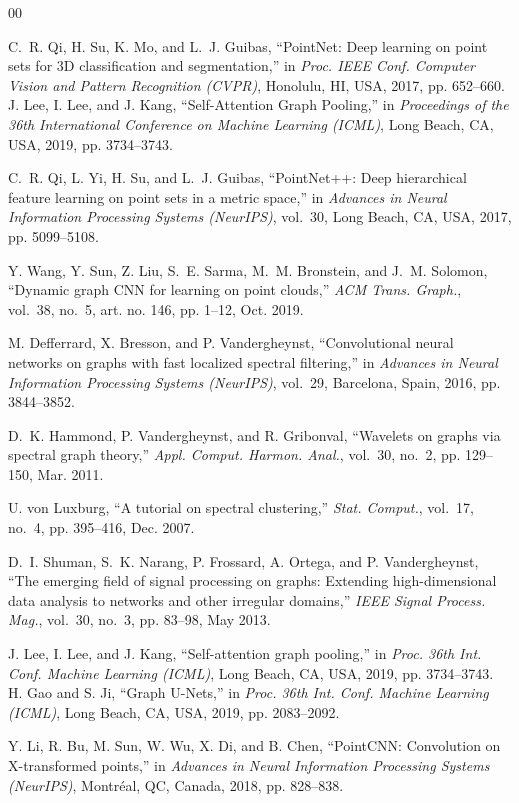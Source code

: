 \documentclass[conference]{IEEEtran}
\begin{document}
\begin{thebibliography}{00}

 C.~R. Qi, H. Su, K. Mo, and L.~J. Guibas, ``PointNet: Deep learning on point sets for 3D classification and segmentation,'' in \emph{Proc. IEEE Conf. Computer Vision and Pattern Recognition (CVPR)}, Honolulu, HI, USA, 2017, pp. 652--660.
 J. Lee, I. Lee, and J. Kang, ``Self-Attention Graph Pooling,'' 
in \emph{Proceedings of the 36th International Conference on Machine Learning (ICML)}, 
Long Beach, CA, USA, 2019, pp. 3734--3743.

 C.~R. Qi, L. Yi, H. Su, and L.~J. Guibas, ``PointNet++: Deep hierarchical feature learning on point sets in a metric space,'' in \emph{Advances in Neural Information Processing Systems (NeurIPS)}, vol.~30, Long Beach, CA, USA, 2017, pp. 5099--5108.

 Y. Wang, Y. Sun, Z. Liu, S.~E. Sarma, M.~M. Bronstein, and J.~M. Solomon, ``Dynamic graph CNN for learning on point clouds,'' \emph{ACM Trans. Graph.}, vol.~38, no.~5, art. no. 146, pp. 1--12, Oct. 2019.

 M. Defferrard, X. Bresson, and P. Vandergheynst, ``Convolutional neural networks on graphs with fast localized spectral filtering,'' in \emph{Advances in Neural Information Processing Systems (NeurIPS)}, vol.~29, Barcelona, Spain, 2016, pp. 3844--3852.

 D.~K. Hammond, P. Vandergheynst, and R. Gribonval, ``Wavelets on graphs via spectral graph theory,'' \emph{Appl. Comput. Harmon. Anal.}, vol.~30, no.~2, pp. 129--150, Mar. 2011.

 U. von Luxburg, ``A tutorial on spectral clustering,'' \emph{Stat. Comput.}, vol.~17, no.~4, pp. 395--416, Dec. 2007.

 D.~I. Shuman, S.~K. Narang, P. Frossard, A. Ortega, and P. Vandergheynst, ``The emerging field of signal processing on graphs: Extending high-dimensional data analysis to networks and other irregular domains,'' \emph{IEEE Signal Process. Mag.}, vol.~30, no.~3, pp. 83--98, May 2013.

 J. Lee, I. Lee, and J. Kang, ``Self-attention graph pooling,'' in \emph{Proc. 36th Int. Conf. Machine Learning (ICML)}, Long Beach, CA, USA, 2019, pp. 3734--3743.
 H. Gao and S. Ji, ``Graph U-Nets,'' in \emph{Proc. 36th Int. Conf. Machine Learning (ICML)}, Long Beach, CA, USA, 2019, pp. 2083--2092.

 Y. Li, R. Bu, M. Sun, W. Wu, X. Di, and B. Chen, ``PointCNN: Convolution on X-transformed points,'' in \emph{Advances in Neural Information Processing Systems (NeurIPS)}, Montréal, QC, Canada, 2018, pp. 828--838.


\end{thebibliography}
\end{document}
